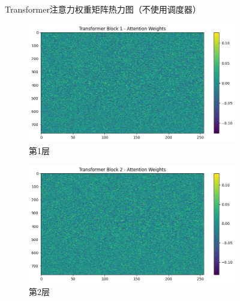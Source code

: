 \begin{figure}[H]
    \caption{Transformer注意力权重矩阵热力图（不使用调度器）}
    \label{fig:transformerattentionweightsnoscheduler}
\end{figure}

\begin{figure}[H]
    \centering
    \begin{subfigure}{0.3\textwidth}
        \includegraphics[width=\linewidth]{../output/transformer/with scheduler/Transformer Block 1 Attention Weights.png}
        \caption{第1层}
        \label{fig:transformerblock1attentionweightswithscheduler}
    \end{subfigure}
    \hfill
    \begin{subfigure}{0.3\textwidth}
        \includegraphics[width=\linewidth]{../output/transformer/with scheduler/Transformer Block 2 Attention Weights.png}
        \caption{第2层}
        \label{fig:transformerblock2attentionweightswithscheduler}
    \end{subfigure}
    \hfill
    \begin{subfigure}{0.3\textwidth}

\end{subfigure}
\end{figure}
